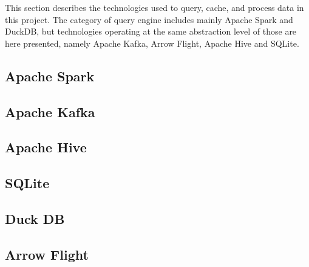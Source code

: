 This section describes the technologies used to query, cache, and process data in this project. The category of query engine includes mainly Apache Spark and DuckDB, but technologies operating at the same abstraction level of those are here presented, namely Apache Kafka, Arrow Flight, Apache Hive and SQLite. 

\subsection{Apache Spark}

\subsection{Apache Kafka}

\subsection{Apache Hive}

\subsection{SQLite}

\subsection{Duck DB}

\subsection{Arrow Flight}
